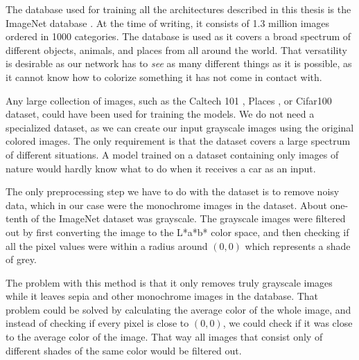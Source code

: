 The database used for training all the architectures described in this thesis is 
the ImageNet database \citep{deng2009imagenet}. At the time of writing, it 
consists of 1.3 million images ordered in 1000 categories. The database is used 
as it covers a broad spectrum of different objects, animals, and places from all 
around the world. That versatility is desirable as our network has to \textit{see}
as many different things as it is possible, as it cannot know how to colorize something 
it has not come in contact with.

Any large collection of images, such as the Caltech 101 \citep{fei2004caltech}, 
Places \citep{zhou2017places}, or Cifar100\citep{krizhevskycifar} dataset, 
could have been used for training the models. We do not need a specialized dataset, 
as we can create our input grayscale images using the original colored images.
The only requirement is that the dataset covers a large spectrum of different
situations. A model trained on a dataset containing only images of nature 
would hardly know what to do when it receives a car as an input.

The only preprocessing step we have to do with the dataset is to remove noisy data, 
which in our case were the monochrome images in the dataset. About one-tenth of 
the ImageNet dataset was grayscale. The grayscale images were filtered out by 
first converting the image to the L*a*b* color space, and then checking if all 
the pixel values were within a radius around $(0, 0)$ which represents a shade of grey. 

The problem with this method is that it only removes truly grayscale images while
it leaves sepia and other monochrome images in the database. That problem could 
be solved by calculating the average color of the whole image, and instead of
checking if every pixel is close to $(0, 0)$, we could check if it was close
to the average color of the image. That way all images that consist only of 
different shades of the same color would be filtered out.
